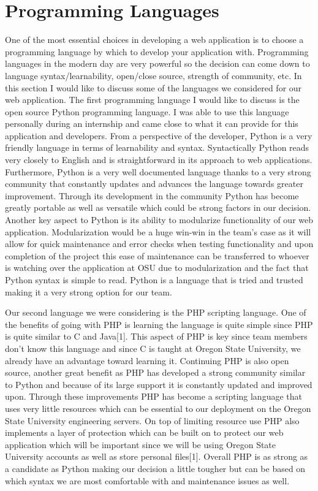 \documentclass[letterpaper, 10pt, draftclsnofoot,onecolumn]{IEEEtran}
\begin{document}
\section{Programming Languages}
One of the most essential choices in developing a web application is to choose a programming language by which to develop your application with. Programming languages in the modern day are very powerful so the decision can come down to language syntax/learnability, open/close source, strength of community, etc. In this section I would like to discuss some of the languages we considered for our web application. 
The first programming language I would like to discuss is the open source Python programming language. I was able to use this language personally during an internship and came close to what it can provide for this application and developers. From a perspective of the developer, Python is a very friendly language in terms of learnability and syntax. Syntactically Python reads very closely to English and is straightforward in its approach to web applications. Furthermore, Python is a very well documented language thanks to a very strong community that constantly updates and advances the language towards greater improvement. Through its development in the community Python has become greatly portable as well as versatile which could be strong factors in our decision. Another key aspect to Python is its ability to modularize functionality of our web application. Modularization would be a huge win-win in the team’s case as it will allow for quick maintenance and error checks when testing functionality and upon completion of the project this ease of maintenance can be transferred to whoever is watching over the application at OSU due to modularization and the fact that Python syntax is simple to read.  Python is a language that is tried and trusted making it a very strong option for our team. 

Our second language we were considering is the PHP scripting language. One of the benefits of going with PHP is learning the language is quite simple since PHP is quite similar to C and Java[1]. This aspect of PHP is key since team members don’t know this language and since C is taught at Oregon State University, we already have an advantage toward learning it. Continuing PHP is also open source, another great benefit as PHP has developed a strong community similar to Python and because of its large support it is constantly updated and improved upon. Through these improvements PHP has become a scripting language that uses very little resources which can be essential to our deployment on the Oregon State University engineering servers. On top of limiting resource use PHP also implements a layer of protection which can be built on to protect our web application which will be important since we will be using Oregon State University accounts as well as store personal files[1]. Overall PHP is as strong as a candidate as Python making our decision a little tougher but can be based on which syntax we are most comfortable with and maintenance issues as well. 
\end{document}
